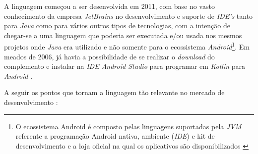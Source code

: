 A linguagem começou a ser desenvolvida em 2011, com base no vasto conhecimento da empresa \textit{JetBrains} no desenvolvimento e suporte de \textit{IDE's} tanto para \textit{Java} como para vários outros tipos de tecnologias, com a intenção de chegar-se a uma linguagem que poderia ser executada e/ou usada nos mesmos projetos onde \textit{Java} era utilizado e não somente para o ecossistema \textit{Android}\footnote[4]{O ecossistema Android é composto pelas linguagens suportadas pela \textit{JVM} referente a programação Android nativa, ambiente (\textit{IDE}) e kit de desenvolvimento e a loja oficial na qual os aplicativos são disponibilizados \cite{EcossitemaAndroid}}. Em meados de 2006, já havia a possibilidade de se realizar o \textit{download} do complemento e instalar na \textit{IDE Android Studio} para programar em \textit{Kotlin} para \textit{Android} \cite{Resende2018}. 

A seguir os pontos que tornam a linguagem tão relevante no mercado de desenvolvimento \cite{Resende2018}:

